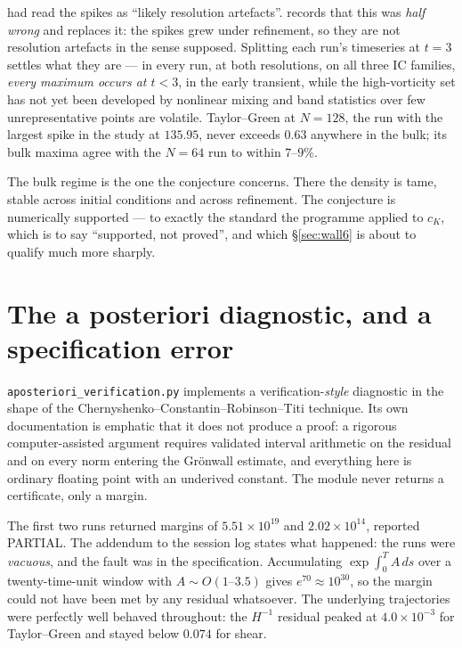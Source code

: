  had read the spikes as ``likely resolution artefacts''.
 records that this was \emph{half wrong} and replaces it: the spikes
grew under refinement, so they are not resolution artefacts in the sense
supposed. Splitting each run's timeseries at \(t=3\) settles what they are ---
in every run, at both resolutions, on all three IC families, \emph{every
maximum occurs at \(t<3\)}, in the early transient, while the high-vorticity
set has not yet been developed by nonlinear mixing and band statistics over
few unrepresentative points are volatile. Taylor--Green at \(N=128\), the run
with the largest spike in the study at \(135.95\), never exceeds \(0.63\)
anywhere in the bulk; its bulk maxima agree with the \(N=64\) run to within
\(7\)--\(9\%\).

The bulk regime is the one the conjecture concerns. There the density is tame,
stable across initial conditions and across refinement. The conjecture is
numerically supported --- to exactly the standard the programme applied to
\(c_K\), which is to say ``supported, not proved'', and which
\S\ref{sec:wall6} is about to qualify much more sharply.

\section{The a posteriori diagnostic, and a specification error}
\label{sec:aposteriori}

\texttt{aposteriori\_verification.py} implements a verification-\emph{style}
diagnostic in the shape of the Chernyshenko--Constantin--Robinson--Titi
technique. Its own documentation is emphatic that it does not produce a proof:
a rigorous computer-assisted argument requires validated interval arithmetic on
the residual and on every norm entering the Gr\"onwall estimate, and everything
here is ordinary floating point with an underived constant. The module never
returns a certificate, only a margin.

The first two runs returned margins of \(5.51\times10^{19}\) and
\(2.02\times10^{14}\), reported \textsf{PARTIAL}. The addendum to the session
log states what happened: the runs were \emph{vacuous}, and the fault was in
the specification. Accumulating \(\exp\int_0^TA\,ds\) over a twenty-time-unit
window with \(A\sim O(1\text{--}3.5)\) gives \(e^{70}\approx10^{30}\), so the
margin could not have been met by any residual whatsoever. The underlying
trajectories were perfectly well behaved throughout: the \(H^{-1}\) residual
peaked at \(4.0\times10^{-3}\) for Taylor--Green and stayed below \(0.074\)
for shear.

